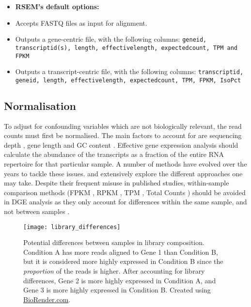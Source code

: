 \begin{itemize}\itemsep0em
\item[] \textbf{RSEM's default options:}
\item Accepts FASTQ files as input for alignment.
\item Outputs a gene-centric file, with the following columns: \texttt{gene\textunderscore id, transcript\textunderscore id(s), length, effective\textunderscore length, expected\textunderscore count, TPM and FPKM}
\item Outputs a transcript-centric file, with the following columns: \texttt{transcript\textunderscore id, gene\textunderscore id, length, effective\textunderscore length, expected\textunderscore count, TPM, FPKM, IsoPct}
\end{itemize}

\subsection{Normalisation}

To adjust for confounding variables which are not biologically relevant, the read counts must first be normalised. The main factors to account for are sequencing depth \citep{robinson2010scaling}, gene length \citep{oshlack2009transcript} and GC content \citep{risso2011gc}. Effective gene expression analysis should calculate the abundance of the transcripts as a fraction of the entire RNA repertoire for that particular sample. A number of methods have evolved over the years to tackle these issues. \cite{dillies2013comprehensive} and \cite{bullard2010evaluation} extensively explore the different approaches one may take. Despite their frequent misuse in published studies, within-sample comparison methods (FPKM \citep{trapnell2010transcript}, RPKM \citep{mortazavi2008mapping}, TPM \citep{li2011rsem}, Total Counts \citep{dillies2013comprehensive}) should be avoided in \ac{DGE} analysis as they only account for differences within the same sample, and not between samples \citep{dundar2015introduction, zhao2020misuse}.

\begin{figure}[!h]
    \centering
    \texttt{[image: library\_differences]}
    \caption[Differences in library composition between samples]{Potential differences between samples in library composition. Condition A has more reads aligned to Gene 1 than Condition B, but it is considered more highly expressed in Condition B since the \textit{proportion} of the reads is higher. After accounting for library differences, Gene 2 is more highly expressed in Condition A, and Gene 3 is more highly expressed in Condition B. Created using \href{https://biorender.com/}{BioRender.com}. } 
    \label{fig:lib_diff}
\end{figure}

